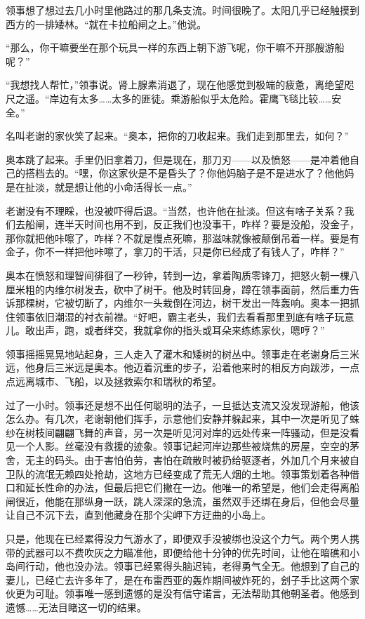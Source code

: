 \documentclass[AutoFakeBold=true]{book}
\begin{document}
领事想了想过去几小时里他路过的那几条支流。时间很晚了。太阳几乎已经触摸到西方的一排矮林。``就在卡拉船闸之上。''他说。

``那么，你干嘛要坐在那个玩具一样的东西上朝下游飞呢，你干嘛不开那艘游船呢？''

``我想找人帮忙，''领事说。肾上腺素消退了，现在他感觉到极端的疲惫，离绝望咫尺之遥。``岸边有太多……太多的匪徒。乘游船似乎太危险。霍鹰飞毯比较……安全。''

名叫老谢的家伙笑了起来。``奥本，把你的刀收起来。我们走到那里去，如何？''

奥本跳了起来。手里仍旧拿着刀，但是现在，那刀刃——以及愤怒——是冲着他自己的搭档去的。``嘿，你这家伙是不是昏头了？你他妈脑子是不是进水了？他他妈是在扯淡，就是想让他的小命活得长一点。''

老谢没有不理睬，也没被吓得后退。``当然，也许他在扯淡。但这有啥子关系？我们去船闸，连半天时间也用不到，反正我们也没事干，咋样？要是没船，没金子，那你就把他咔嚓了，咋样？不就是慢点死嘛，那滋味就像被颠倒吊着一样。要是有金子，你不一样把他咔嚓了，拿刀的干活，只是你已经成了有钱人了，咋样？''

奥本在愤怒和理智间徘徊了一秒钟，转到一边，拿着陶质零锋刀，把怒火朝一棵八厘米粗的内维尔树发去，砍中了树干。他及时转回身，蹲在领事面前，然后重力告诉那棵树，它被切断了，内维尔一头栽倒在河边，树干发出一阵轰响。奥本一把抓住领事依旧潮湿的衬衣前襟。``好吧，霸主老头，我们去看看那里到底有啥子玩意儿。敢出声，跑，或者绊交，我就拿你的指头或耳朵来练练家伙，嗯哼？''

领事摇摇晃晃地站起身，三人走入了灌木和矮树的树丛中。领事走在老谢身后三米远，他身后三米远是奥本。他迈着沉重的步子，沿着他来时的相反方向跋涉，一点点远离城市、飞船，以及拯救索尔和瑞秋的希望。

\vspace*{1em}

过了一小时。领事还是想不出任何聪明的法子，一旦抵达支流又没发现游船，他该怎么办。有几次，老谢朝他们挥手，示意他们安静并躲起来，其中一次是听见了蛛纱在树枝间翩翩飞舞的声音，另一次是听见河对岸的远处传来一阵骚动，但是没看见一个人影。丝毫没有救援的迹象。领事记起河岸边那些被烧焦的房屋，空空的茅舍，无主的码头。由于害怕伯劳，害怕在疏散时被扔给驱逐者，外加几个月来被自卫队的流氓无赖四处抢劫，这地方已经变成了荒无人烟的土地。领事策划着各种借口和延长性命的办法，但最后把它们撇在一边。他唯一的希望是，他们会走得离船闸很近，他能在那纵身一跃，跳人深深的急流，虽然双手还绑在身后，但他会尽量让自己不沉下去，直到他藏身在那个尖岬下方迂曲的小岛上。

只是，他现在已经累得没力气游水了，即便双手没被绑也没这个力气。两个男人携带的武器可以不费吹灰之力瞄准他，即便给他十分钟的优先时间，让他在暗礁和小岛间行动，他也没办法。领事已经累得头脑迟钝，老得勇气全无。他想到了自己的妻儿，已经亡去许多年了，是在布雷西亚的轰炸期间被炸死的，刽子手比这两个家伙更为可耻。领事唯一感到遗憾的是没有信守诺言，无法帮助其他朝圣者。他感到遗憾……无法目睹这一切的结果。
\end{document}
